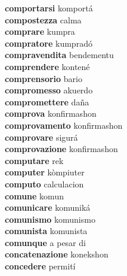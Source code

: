 \textbf{comportarsi } komportá \\
\textbf{compostezza } calma \\
\textbf{comprare } kumpra \\
\textbf{compratore } kumpradó \\
\textbf{compravendita } bendementu \\
\textbf{comprendere } kontené \\
\textbf{comprensorio } bario \\
\textbf{compromesso } akuerdo \\
\textbf{compromettere } daña \\
\textbf{comprova } konfirmashon \\
\textbf{comprovamento } konfirmashon \\
\textbf{comprovare } sigurá \\
\textbf{comprovazione } konfirmashon \\
\textbf{computare } rek \\
\textbf{computer } kòmpiuter \\
\textbf{computo } calculacion \\
\textbf{comune } komun \\
\textbf{comunicare } komuniká \\
\textbf{comunismo } komunismo \\
\textbf{comunista } komunista \\
\textbf{comunque } a pesar di \\
\textbf{concatenazione } konekshon \\
\textbf{concedere } permití \\
